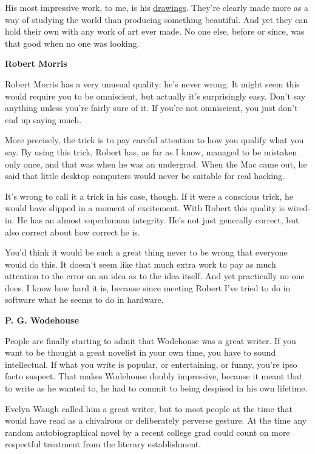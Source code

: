 \documentclass[12pt]{book}
\begin{document}
His most impressive work, to me, is his
\href{https://sep.turbifycdn.com/ty/cdn/paulgraham/leonardo-skull.jpg?t=1688221954&}{drawings}.
They're clearly made more as a way of studying the world than producing
something beautiful. And yet they can hold their own with any work of
art ever made. No one else, before or since, was that good when no one
was looking.

\textbf{Robert Morris}

Robert Morris has a very unusual quality: he's never wrong. It might
seem this would require you to be omniscient, but actually it's
surprisingly easy. Don't say anything unless you're fairly sure of it.
If you're not omniscient, you just don't end up saying much.

More precisely, the trick is to pay careful attention to how you qualify
what you say. By using this trick, Robert has, as far as I know, managed
to be mistaken only once, and that was when he was an undergrad. When
the Mac came out, he said that little desktop computers would never be
suitable for real hacking.

It's wrong to call it a trick in his case, though. If it were a
conscious trick, he would have slipped in a moment of excitement. With
Robert this quality is wired-in. He has an almost superhuman integrity.
He's not just generally correct, but also correct about how correct he
is.

You'd think it would be such a great thing never to be wrong that
everyone would do this. It doesn't seem like that much extra work to pay
as much attention to the error on an idea as to the idea itself. And yet
practically no one does. I know how hard it is, because since meeting
Robert I've tried to do in software what he seems to do in hardware.

\textbf{P. G. Wodehouse}

People are finally starting to admit that Wodehouse was a great writer.
If you want to be thought a great novelist in your own time, you have to
sound intellectual. If what you write is popular, or entertaining, or
funny, you're ipso facto suspect. That makes Wodehouse doubly
impressive, because it meant that to write as he wanted to, he had to
commit to being despised in his own lifetime.

Evelyn Waugh called him a great writer, but to most people at the time
that would have read as a chivalrous or deliberately perverse gesture.
At the time any random autobiographical novel by a recent college grad
could count on more respectful treatment from the literary
establishment.
\end{document}
